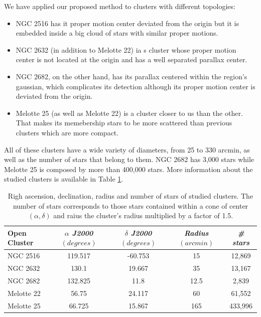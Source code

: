 \documentclass[11pt, a4paper, english]{book}
\begin{document}
We have applied our proposed method to clusters with different topologies:

\begin{itemize}
  \item NGC 2516 has it proper motion center deviated from the origin but
        it is embedded inside a big cloud of stars with similar proper motions.
  \item NGC 2632 (in addition to Melotte 22) ia s cluster whose proper motion center
        is not located at the origin and has a well separated parallax center.
  \item NGC 2682, on the other hand, has its parallax centered within the region's gaussian,
        which complicates its detection although its proper motion center is deviated from the origin.
  \item Melotte 25 (as well as Melotte 22) is a cluster closer to us than the other.
        That makes its memebership stars to be more scattered than previous clusters which are more compact.
\end{itemize}

All of these clusters have a wide variety of diameters, from 25 to 330 arcmin,
as well as the number of stars that belong to them.
NGC 2682 has 3,000 stars while Melotte 25 is composed by more than 400,000 stars.
More information about the studied clusters is available in Table \ref{tab:clusters_summary}.

\begin{table}[h!]
  \begin{center}
    \begin{tabular}{l|c|c|c|c}
      \textbf{Open Cluster} & \emph{$\alpha$ J2000 $(degrees)$} & \emph{$\delta$ J2000 $(degrees)$} & \emph{Radius $(arcmin)$} & \emph{\# stars} \\
      \hline
      NGC 2516 & 119.517 & -60.753 & 15 & 12,869 \\
      NGC 2632 & 130.1 & 19.667 & 35 & 13,167 \\
      NGC 2682 & 132.825 & 11.8 & 12.5 & 2,839 \\
      Melotte 22 & 56.75 & 24.117 & 60 & 61,552 \\
      Melotte 25 & 66.725 & 15.867 & 165 & 433,996 \\
    \end{tabular}
    \caption{Righ ascension, declination, radius and number of stars of studied clusters.
             The number of stars corresponds to those stars contained within a cone of center
             $(\alpha, \delta)$ and raius the cluster's radius multiplied by a factor of 1.5.}
    \label{tab:clusters_summary}
  \end{center}
\end{table}
\end{document}
